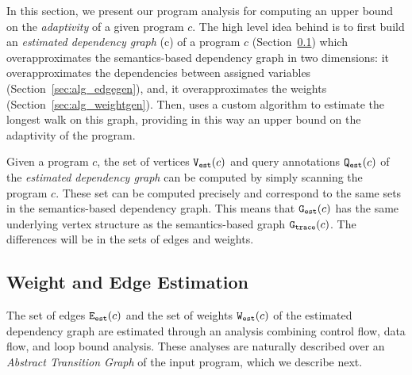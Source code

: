 In this section, we present our program analysis {\THESYSTEM} for
computing an upper bound on the \emph{adaptivity} of a given program
$c$.  The high level idea behind {\THESYSTEM} is to first build
an \emph{estimated dependency graph} \progG(c) of a program $c$
(Section~\ref{sec:alg_weightedgegen}) which overapproximates the
semantics-based dependency graph in two dimensions: it
overapproximates the dependencies between assigned variables (Section~\ref{sec:alg_edgegen}), and, it
overapproximates the weights (Section~\ref{sec:alg_weightgen}). Then, {\THESYSTEM} uses a custom algorithm to estimate the longest
walk on this graph, providing in this way an upper bound on the adaptivity of the
program.


%
%
Given a program $c$, the set of vertices $\mathtt{{V_{est}}}(c)$ and query annotations $\mathtt{{Q_{est}}}(c)$ of the \emph{estimated dependency graph} can be computed by simply
scanning the program $c$. These set can be computed precisely and correspond to
the same sets in the semantics-based dependency graph.
This means that $\mathtt{{G_{est}}}(c)$ has the same underlying vertex structure as 
the semantics-based graph $\mathtt{{G_{trace}}}(c)$. The differences will be in the sets of edges and weights. 



\subsection{Weight and Edge Estimation}
\label{sec:alg_weightedgegen}
The set of edges $\mathtt{{E_{est}}}(c)$ and the set of weights $\mathtt{{W_{est}}}(c)$ of the estimated dependency graph are estimated through an analysis combining control flow, data flow, and loop bound analysis. These analyses are naturally described over an  \emph{Abstract Transition Graph} of the input program, which we describe next.
%
%
